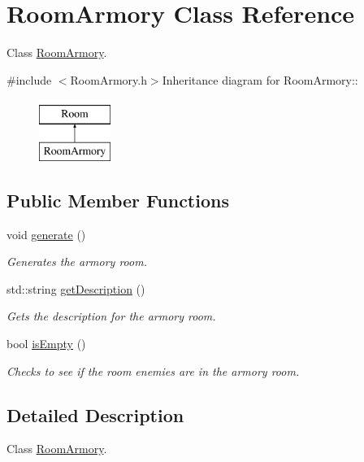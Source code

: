 \hypertarget{classRoomArmory}{
\section{RoomArmory Class Reference}
\label{classRoomArmory}
}


Class \hyperlink{classRoomArmory}{RoomArmory}.  


{\ttfamily \#include $<$RoomArmory.h$>$}Inheritance diagram for RoomArmory::\begin{figure}[H]
\begin{center}
\leavevmode
\includegraphics[height=2cm]{classRoomArmory}
\end{center}
\end{figure}
\subsection*{Public Member Functions}
\begin{DoxyCompactItemize}
\item 
void \hyperlink{classRoomArmory_a7b8a849994b2e71b1762420f08b5dcf2}{generate} ()
\begin{DoxyCompactList}\small\item\em Generates the armory room. \item\end{DoxyCompactList}\item 
std::string \hyperlink{classRoomArmory_af4199a79cd8e191eb01feb93b19e5a4e}{getDescription} ()
\begin{DoxyCompactList}\small\item\em Gets the description for the armory room. \item\end{DoxyCompactList}\item 
bool \hyperlink{classRoomArmory_a88517bf2ee701232041c415684649c91}{isEmpty} ()
\begin{DoxyCompactList}\small\item\em Checks to see if the room enemies are in the armory room. \item\end{DoxyCompactList}\end{DoxyCompactItemize}


\subsection{Detailed Description}
Class \hyperlink{classRoomArmory}{RoomArmory}. 

